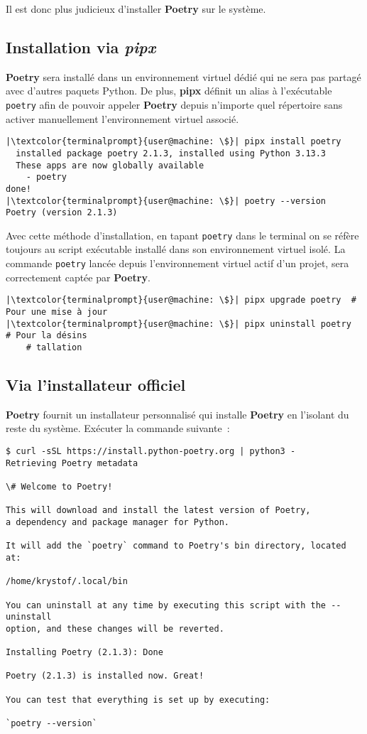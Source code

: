 Il est donc plus judicieux d'installer \textbf{Poetry} sur le système.

\subsection*{Installation via \textit{pipx}}
\textbf{Poetry} sera installé dans un environnement virtuel dédié qui ne sera pas partagé avec d’autres paquets Python. De plus, \textbf{pipx} définit un alias à l’exécutable \texttt{poetry} afin de pouvoir appeler \textbf{Poetry} depuis n’importe quel répertoire sans activer manuellement l’environnement virtuel associé.
\begin{lstlisting}[style=terminal]
|\textcolor{terminalprompt}{user@machine: \$}| pipx install poetry
  installed package poetry 2.1.3, installed using Python 3.13.3
  These apps are now globally available
    - poetry
done! 
|\textcolor{terminalprompt}{user@machine: \$}| poetry --version
Poetry (version 2.1.3)
\end{lstlisting}

Avec cette méthode d'installation, en tapant \texttt{poetry} dans le terminal on se réfère toujours au script exécutable installé dans son environnement virtuel isolé. La commande \texttt{poetry} lancée depuis l'environnement virtuel actif d'un projet, sera correctement captée par \textbf{Poetry}.

\begin{lstlisting}[style=terminal]
|\textcolor{terminalprompt}{user@machine: \$}| pipx upgrade poetry  # Pour une mise à jour
|\textcolor{terminalprompt}{user@machine: \$}| pipx uninstall poetry  # Pour la désins
    # tallation
\end{lstlisting}

\subsection*{Via l'installateur officiel}
\textbf{Poetry} fournit un installateur personnalisé qui installe \textbf{Poetry} en l'isolant du reste du système. Exécuter la commande suivante :
\begin{verbatim}
$ curl -sSL https://install.python-poetry.org | python3 -
Retrieving Poetry metadata

\# Welcome to Poetry!

This will download and install the latest version of Poetry,
a dependency and package manager for Python.

It will add the `poetry` command to Poetry's bin directory, located at:

/home/krystof/.local/bin

You can uninstall at any time by executing this script with the --uninstall 
option, and these changes will be reverted.

Installing Poetry (2.1.3): Done

Poetry (2.1.3) is installed now. Great!

You can test that everything is set up by executing:

`poetry --version`
\end{verbatim}

